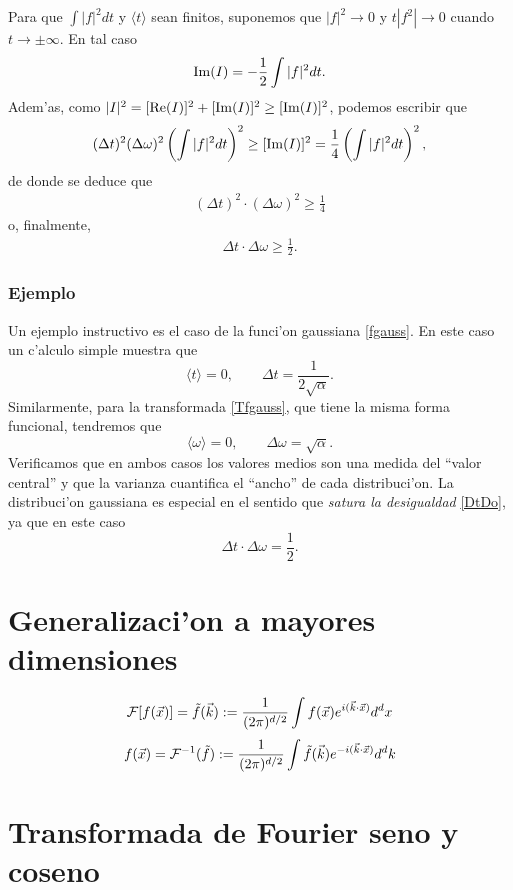 Para que $\int |f|^2 dt$ y $\langle t \rangle$ sean finitos, suponemos que $|f|^2\rightarrow 0$ y $t|f^2| \rightarrow 0$ cuando $t \rightarrow \pm \infty$. En tal caso
\begin{align}
{\rm Im}(I)=-\frac{1}{2}\int |f|^2 dt.
\end{align}
Adem'as, como $|I|^2=[{\rm Re}(I)]^2+[{\rm Im}(I)]^2\geq [{\rm Im}(I)]^2$, podemos escribir que
\begin{align}
(\Delta t)^2 (\Delta \omega)^2 \left(\int |f|^2 dt \right)^2 \geq [{\rm Im}(I)]^2= \frac{1}{4} \left( \int |f|^2 dt\right)^2,
\end{align}
de donde se deduce que
\begin{align}
(\Delta t)^2 \cdot (\Delta\omega)^2 \geq \frac{1}{4}
\end{align}
o, finalmente,
\begin{align}\label{DtDo}
\boxed{
\Delta t\cdot \Delta\omega\ge\frac{1}{2}.
}
\end{align}

\subsubsection{Ejemplo}
Un ejemplo instructivo es el caso de la funci'on gaussiana \eqref{fgauss}. En este caso un c'alculo simple muestra que
\begin{equation}
\langle t\rangle=0,  \qquad \Delta t =\frac{1}{2\sqrt{\alpha}}.
\end{equation}
Similarmente, para la transformada \eqref{Tfgauss}, que tiene la misma forma funcional, tendremos que
\begin{equation}
\langle\omega\rangle=0,  \qquad \Delta\omega =\sqrt{\alpha}.
\end{equation}
Verificamos que en ambos casos los valores medios son una medida del ``valor central'' y que la varianza cuantifica el ``ancho'' de cada distribuci'on. La distribuci'on gaussiana es especial en el sentido que \textit{satura la desigualdad} \eqref{DtDo}, ya que en este caso
\begin{equation}
\Delta t\cdot \Delta\omega =\frac{1}{2}.
\end{equation}
\section{Generalizaci'on a mayores dimensiones}
\begin{equation}
{\cal F}[f(\vec{x})]=\tilde{f}(\vec{k})
:=\frac{1}{(2\pi)^{d/2}}\int f(\vec{x})e^{i(\vec{k}\cdot\vec{x})}d^dx
\end{equation}
\begin{equation}
f(\vec{x})={\cal F}^{-1}(\tilde{f})
:=\frac{1}{(2\pi)^{d/2}}\int \tilde{f}(\vec{k})e^{-i(\vec{k}\cdot\vec{x})}d^dk
\end{equation}
%
\section{Transformada de Fourier seno y coseno}










